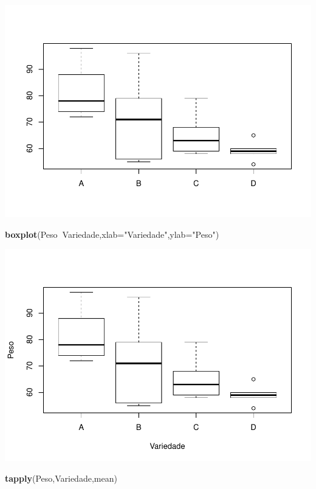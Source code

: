 \documentclass[12pt,brazil,]{book}
\newenvironment{Shaded}{\begin{snugshade}}{\end{snugshade}}
\newcommand{\DataTypeTok}[1]{\textcolor[rgb]{0.13,0.29,0.53}{#1}}
\newcommand{\KeywordTok}[1]{\textcolor[rgb]{0.13,0.29,0.53}{\textbf{#1}}}
\newcommand{\NormalTok}[1]{#1}
\newcommand{\OperatorTok}[1]{\textcolor[rgb]{0.81,0.36,0.00}{\textbf{#1}}}
\newcommand{\StringTok}[1]{\textcolor[rgb]{0.31,0.60,0.02}{#1}}
\begin{document}
\includegraphics{02-Delinexp_files/figure-latex/unnamed-chunk-5-1.pdf}

\begin{Shaded}
\begin{Highlighting}[]
\KeywordTok{boxplot}\NormalTok{(Peso}\OperatorTok{~}\NormalTok{Variedade,}\DataTypeTok{xlab=}\StringTok{"Variedade"}\NormalTok{,}\DataTypeTok{ylab=}\StringTok{"Peso"}\NormalTok{)}
\end{Highlighting}
\end{Shaded}

\includegraphics{02-Delinexp_files/figure-latex/unnamed-chunk-5-2.pdf}

\begin{Shaded}
\begin{Highlighting}[]
\KeywordTok{tapply}\NormalTok{(Peso,Variedade,mean)}
\end{Highlighting}
\end{Shaded}
\end{document}
